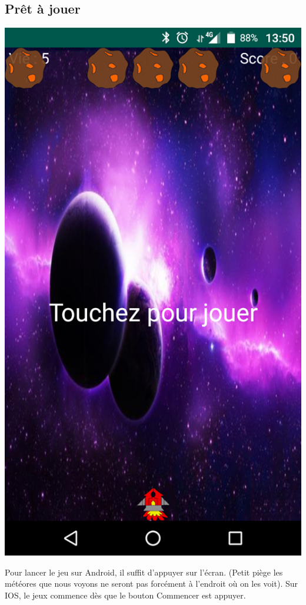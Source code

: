 \documentclass{article}
\begin{document}
\subsection{Prêt à jouer} 
\begin{center}
 \includegraphics[scale=0.2]{BeforeGame.png}
\end{center}

Pour lancer le jeu sur Android, il suffit d'appuyer sur l'écran. (Petit piège les météores que nous voyons ne seront pas forcément à l'endroit où on les voit).
Sur IOS, le jeux commence dès que le bouton Commencer est appuyer.
\end{document}
